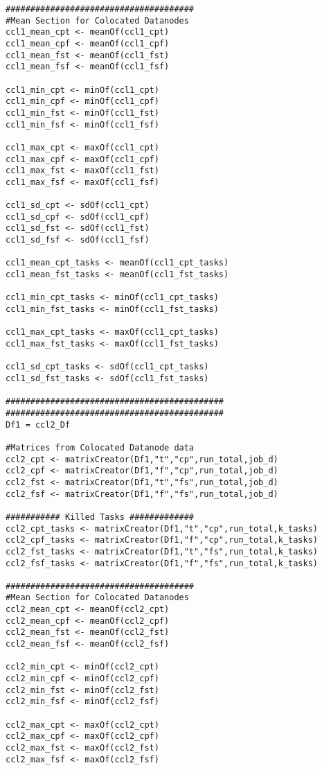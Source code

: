 \begin{verbatim}
######################################
#Mean Section for Colocated Datanodes
ccl1_mean_cpt <- meanOf(ccl1_cpt)
ccl1_mean_cpf <- meanOf(ccl1_cpf)
ccl1_mean_fst <- meanOf(ccl1_fst)
ccl1_mean_fsf <- meanOf(ccl1_fsf)

ccl1_min_cpt <- minOf(ccl1_cpt)
ccl1_min_cpf <- minOf(ccl1_cpf)
ccl1_min_fst <- minOf(ccl1_fst)
ccl1_min_fsf <- minOf(ccl1_fsf)

ccl1_max_cpt <- maxOf(ccl1_cpt)
ccl1_max_cpf <- maxOf(ccl1_cpf)
ccl1_max_fst <- maxOf(ccl1_fst)
ccl1_max_fsf <- maxOf(ccl1_fsf)

ccl1_sd_cpt <- sdOf(ccl1_cpt)
ccl1_sd_cpf <- sdOf(ccl1_cpf)
ccl1_sd_fst <- sdOf(ccl1_fst)
ccl1_sd_fsf <- sdOf(ccl1_fsf)

ccl1_mean_cpt_tasks <- meanOf(ccl1_cpt_tasks)
ccl1_mean_fst_tasks <- meanOf(ccl1_fst_tasks)

ccl1_min_cpt_tasks <- minOf(ccl1_cpt_tasks)
ccl1_min_fst_tasks <- minOf(ccl1_fst_tasks)

ccl1_max_cpt_tasks <- maxOf(ccl1_cpt_tasks)
ccl1_max_fst_tasks <- maxOf(ccl1_fst_tasks)

ccl1_sd_cpt_tasks <- sdOf(ccl1_cpt_tasks)
ccl1_sd_fst_tasks <- sdOf(ccl1_fst_tasks)

############################################
############################################
Df1 = ccl2_Df

#Matrices from Colocated Datanode data
ccl2_cpt <- matrixCreator(Df1,"t","cp",run_total,job_d)
ccl2_cpf <- matrixCreator(Df1,"f","cp",run_total,job_d)
ccl2_fst <- matrixCreator(Df1,"t","fs",run_total,job_d)
ccl2_fsf <- matrixCreator(Df1,"f","fs",run_total,job_d)

########### Killed Tasks #############
ccl2_cpt_tasks <- matrixCreator(Df1,"t","cp",run_total,k_tasks)
ccl2_cpf_tasks <- matrixCreator(Df1,"f","cp",run_total,k_tasks)
ccl2_fst_tasks <- matrixCreator(Df1,"t","fs",run_total,k_tasks)
ccl2_fsf_tasks <- matrixCreator(Df1,"f","fs",run_total,k_tasks)

######################################
#Mean Section for Colocated Datanodes
ccl2_mean_cpt <- meanOf(ccl2_cpt)
ccl2_mean_cpf <- meanOf(ccl2_cpf)
ccl2_mean_fst <- meanOf(ccl2_fst)
ccl2_mean_fsf <- meanOf(ccl2_fsf)

ccl2_min_cpt <- minOf(ccl2_cpt)
ccl2_min_cpf <- minOf(ccl2_cpf)
ccl2_min_fst <- minOf(ccl2_fst)
ccl2_min_fsf <- minOf(ccl2_fsf)

ccl2_max_cpt <- maxOf(ccl2_cpt)
ccl2_max_cpf <- maxOf(ccl2_cpf)
ccl2_max_fst <- maxOf(ccl2_fst)
ccl2_max_fsf <- maxOf(ccl2_fsf)



\end{verbatim}
